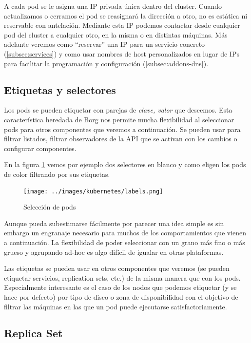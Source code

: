 A cada pod se le asigna una IP privada única dentro del cluster. Cuando actualizamos o cerramos el pod se reasignará la dirección a otro, no es estática ni reservable con antelación. Mediante esta IP podemos contactar desde cualquier pod del cluster a cualquier otro, en la misma o en distintas máquinas. Más adelante veremos como ``reservar'' una IP para un servicio concreto (\ref{subsec:services}) y como usar nombres de host personalizados en lugar de IPs para facilitar la programación y configuración (\ref{subsec:addons-dns}).

\subsection{Etiquetas y selectores}
\label{subsec:labels-selectors}

Los pods se pueden etiquetar con parejas de \emph{clave, valor} que deseemos. Esta característica heredada de Borg nos permite mucha flexibilidad al seleccionar pods para otros componentes que veremos a continuación. Se pueden usar para filtrar listados, filtrar observadores de la API que se activan con los cambios o configurar componentes.

En la figura \ref{fig:k8s-labels-selectors} vemos por ejemplo dos selectores en blanco y como eligen los pods de color filtrando por sus etiquetas.

\begin{figure}[H]
    \centering
    \texttt{[image: ../images/kubernetes/labels.png]}
    \caption{Selección de pods}
    \label{fig:k8s-labels-selectors}
\end{figure}

Aunque pueda subestimarse fácilmente por parecer una idea simple es sin embargo un engranaje necesario para muchos de los comportamientos que vienen a continuación. La flexibilidad de poder seleccionar con un grano más fino o más grueso y agrupando ad-hoc es algo difícil de igualar en otras plataformas.

Las etiquetas se pueden usar en otros componentes que veremos (se pueden etiquetar servicios, replication sets, etc.) de la misma manera que con los pods. Especialmente interesante es el caso de los nodos que podemos etiquetar (y se hace por defecto) por tipo de disco o zona de disponibilidad con el objetivo de filtrar las máquinas en las que un pod puede ejecutarse satisfactoriamente.

\subsection{Replica Set}
\label{subsec:rs}

